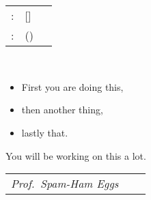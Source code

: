 \chapter*{\TransTask{}}

\makeatletter
\begin{tabular}{lp{0.7\linewidth}}
	\TransFor{}: & \textbf{\@author{}} [\@immnumber{}]\\
	\TransTopic{}: & \textbf{\@title} (\@thesis{})
\end{tabular}\\[\baselineskip]
\makeatother

\kant[1]

\begin{itemize}
	\item First you are doing this,
	\item then another thing,
	\item lastly that.
\end{itemize}

You will be working on this a lot.

\vspace{1.5cm}%
\begin{center}
	\begin{tabular}{M{12em}M{4em}M{12em}}
		{\textit{Prof.\ Spam-Ham Eggs}} & & \textit{\TransPlaceDate{}}\\
	\end{tabular}
\end{center}